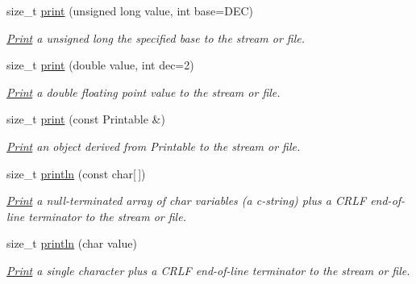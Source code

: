 \begin{DoxyCompactItemize}
size\+\_\+t \mbox{\hyperlink{class_print_acb8c6dcd4339b024436002aa9a6f4be2}{print}} (unsigned long value, int base=D\+EC)
\begin{DoxyCompactList}\small\item\em \mbox{\hyperlink{class_print}{Print}} a unsigned long the specified base to the stream or file. \end{DoxyCompactList}\item 
size\+\_\+t \mbox{\hyperlink{class_print_ad89472bdb6539423a42d350beec02ff4}{print}} (double value, int dec=2)
\begin{DoxyCompactList}\small\item\em \mbox{\hyperlink{class_print}{Print}} a double floating point value to the stream or file. \end{DoxyCompactList}\item 
\mbox{\label{class_print_a901b0f06ae34aab31b8fbb4298f0596e}} 
size\+\_\+t \mbox{\hyperlink{class_print_a901b0f06ae34aab31b8fbb4298f0596e}{print}} (const Printable \&)
\begin{DoxyCompactList}\small\item\em \mbox{\hyperlink{class_print}{Print}} an object derived from Printable to the stream or file. \end{DoxyCompactList}\item 
\mbox{\label{class_print_ad337ce3f7977411b7d34d47a51e5737e}} 
size\+\_\+t \mbox{\hyperlink{class_print_ad337ce3f7977411b7d34d47a51e5737e}{println}} (const char\mbox{[}$\,$\mbox{]})
\begin{DoxyCompactList}\small\item\em \mbox{\hyperlink{class_print}{Print}} a null-\/terminated array of char variables (a c-\/string) plus a C\+R\+LF end-\/of-\/line terminator to the stream or file. \end{DoxyCompactList}\item 
\mbox{\label{class_print_a80fdd92db4b396062586bcb3e08d3835}} 
size\+\_\+t \mbox{\hyperlink{class_print_a80fdd92db4b396062586bcb3e08d3835}{println}} (char value)
\begin{DoxyCompactList}\small\item\em \mbox{\hyperlink{class_print}{Print}} a single character plus a C\+R\+LF end-\/of-\/line terminator to the stream or file. \end{DoxyCompactList}\item 

\end{DoxyCompactItemize}
